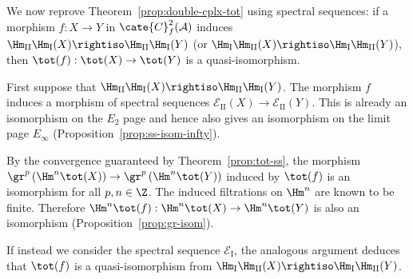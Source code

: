 \begin{example}\label{eg:double-cplx-tot-ss}
	We now reprove Theorem~\ref{prop:double-cplx-tot} using spectral sequences:
	if a morphism $f:X\to Y$ in $\cate{C}^2_f(\mathcal{A})$ induces
	$\Hm_{\mathrm{II}}\Hm_{\mathrm{I}}(X)\rightiso
	\Hm_{\mathrm{II}}\Hm_{\mathrm{I}}(Y)$ (or
	$\Hm_{\mathrm{I}}\Hm_{\mathrm{II}}(X)\rightiso
	\Hm_{\mathrm{I}}\Hm_{\mathrm{II}}(Y)$), then
	$\tot(f):\tot(X)\to\tot(Y)$ is a quasi-isomorphism.

	First suppose that
	$\Hm_{\mathrm{II}}\Hm_{\mathrm{I}}(X)\rightiso
	\Hm_{\mathrm{II}}\Hm_{\mathrm{I}}(Y)$. The morphism $f$ induces a
	morphism of spectral sequences
	$\mathscr{E}_{\mathrm{II}}(X)\to\mathscr{E}_{\mathrm{II}}(Y)$.
	This is already an isomorphism on the $E_2$ page and hence also gives an
	isomorphism on the limit page $E_\infty$
	(Proposition~\ref{prop:ss-isom-infty}).

	By the convergence guaranteed by Theorem~\ref{prop:tot-ss}, the morphism
	$\gr^p\left(\Hm^n\tot(X)\right)\to
	\gr^p\left(\Hm^n\tot(Y)\right)$ induced by $\tot(f)$ is an isomorphism for
	all $p,n\in\Z$. The induced filtrations on $\Hm^n$ are known to be finite.
	Therefore
	$\Hm^n\tot(f):\Hm^n\tot(X)\to\Hm^n\tot(Y)$ is also an isomorphism
	(Proposition~\ref{prop:gr-isom}).

	If instead we consider the spectral sequence $\mathscr{E}_{\mathrm{I}}$,
	the analogous argument deduces that $\tot(f)$ is a quasi-isomorphism from
	$\Hm_{\mathrm{I}}\Hm_{\mathrm{II}}(X)\rightiso
	\Hm_{\mathrm{I}}\Hm_{\mathrm{II}}(Y)$.
\end{example}

